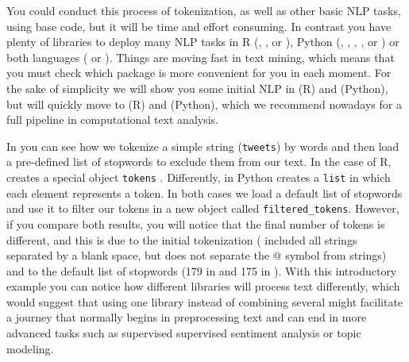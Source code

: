 You could conduct this process of tokenization, as well as other basic NLP tasks, using base code, but it will be time and effort consuming. In contrast you have plenty of libraries to deploy many NLP tasks in R (, ,  or ), Python  (, , , ,  or ) or both languages ( or ). Things are moving fast in text mining, which means that you must check which package is more convenient for you in each moment. For the sake of simplicity we will show you some initial NLP in  (R) and  (Python), but will quickly move to  (R) and  (Python), which we recommend nowadays for a full pipeline in computational text analysis.

In  you can see how we tokenize a simple string (\texttt{tweets}) by words and then load a pre-defined list of stopwords to exclude them from our text. In the case of R,   creates a special object \texttt{tokens} . Differently,  in Python creates a \texttt{list} in which each element represents a token.  In both cases we load a default list of stopwords and use it to filter our tokens in a new object called \texttt{filtered\_tokens}. However, if you compare both results, you will notice that the final number of tokens is different, and this is due to the initial tokenization ( included all strings separated by a blank space, but  does not separate the @ symbol from strings) and to the default list of stopwords (179 in  and 175 in ). With this introductory example you can notice how different libraries will process text differently, which would suggest that using one library instead of combining several might facilitate a journey that normally begins in preprocessing text and can end in more advanced tasks such as supervised supervised sentiment analysis or topic modeling.


